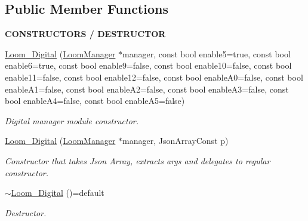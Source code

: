 \subsection*{Public Member Functions}
\begin{Indent}{\bf C\+O\+N\+S\+T\+R\+U\+C\+T\+O\+RS / D\+E\+S\+T\+R\+U\+C\+T\+OR}\par
\begin{DoxyCompactItemize}
\item 
\hyperlink{class_loom___digital_adc24701149576d87752190f0ebb6cb59}{Loom\+\_\+\+Digital} (\hyperlink{class_loom_manager}{Loom\+Manager} $\ast$manager, const bool enable5=true, const bool enable6=true, const bool enable9=false, const bool enable10=false, const bool enable11=false, const bool enable12=false, const bool enable\+A0=false, const bool enable\+A1=false, const bool enable\+A2=false, const bool enable\+A3=false, const bool enable\+A4=false, const bool enable\+A5=false)
\begin{DoxyCompactList}\small\item\em Digital manager module constructor. \end{DoxyCompactList}\item 
\hyperlink{class_loom___digital_a6fd9bb5377ab457d4f41033815ae6d45}{Loom\+\_\+\+Digital} (\hyperlink{class_loom_manager}{Loom\+Manager} $\ast$manager, Json\+Array\+Const p)
\begin{DoxyCompactList}\small\item\em Constructor that takes Json Array, extracts args and delegates to regular constructor. \end{DoxyCompactList}\item 
\hyperlink{class_loom___digital_a126ee351dfddb85be6b7f1984afb1577}{$\sim$\+Loom\+\_\+\+Digital} ()=default
\begin{DoxyCompactList}\small\item\em Destructor. \end{DoxyCompactList}\end{DoxyCompactItemize}
\end{Indent}
